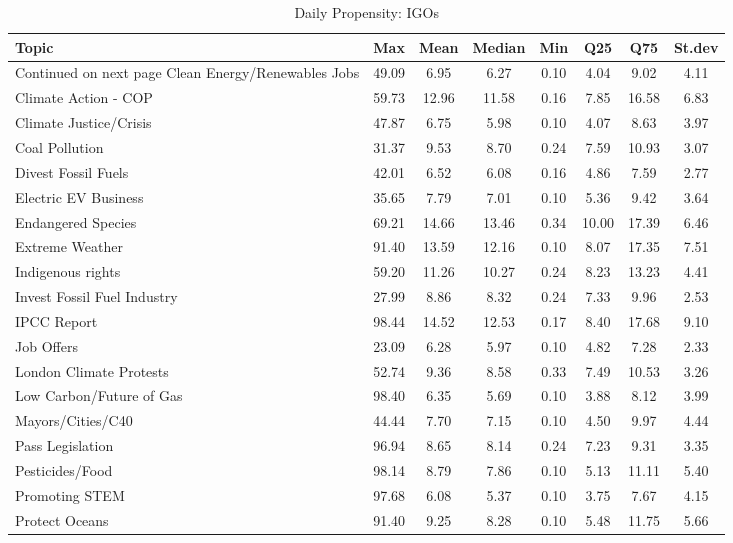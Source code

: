 \begin{longtable}{L|ccccccc}
\caption{Daily Propensity: IGOs} \\ 
  \hline
Topic & Max & Mean & Median & Min & Q25 & Q75 & St.dev \\ 
  \hline 
\endhead 
\hline 
{\footnotesize Continued on next page} 
\endfoot 
\endlastfoot 
Clean Energy/Renewables Jobs & 49.09 & 6.95 & 6.27 & 0.10 & 4.04 & 9.02 & 4.11 \\ 
  Climate Action - COP & 59.73 & 12.96 & 11.58 & 0.16 & 7.85 & 16.58 & 6.83 \\ 
  Climate Justice/Crisis & 47.87 & 6.75 & 5.98 & 0.10 & 4.07 & 8.63 & 3.97 \\ 
  Coal Pollution & 31.37 & 9.53 & 8.70 & 0.24 & 7.59 & 10.93 & 3.07 \\ 
  Divest Fossil Fuels & 42.01 & 6.52 & 6.08 & 0.16 & 4.86 & 7.59 & 2.77 \\ 
  Electric EV Business & 35.65 & 7.79 & 7.01 & 0.10 & 5.36 & 9.42 & 3.64 \\ 
  Endangered Species & 69.21 & 14.66 & 13.46 & 0.34 & 10.00 & 17.39 & 6.46 \\ 
  Extreme Weather & 91.40 & 13.59 & 12.16 & 0.10 & 8.07 & 17.35 & 7.51 \\ 
  Indigenous rights & 59.20 & 11.26 & 10.27 & 0.24 & 8.23 & 13.23 & 4.41 \\ 
  Invest Fossil Fuel Industry & 27.99 & 8.86 & 8.32 & 0.24 & 7.33 & 9.96 & 2.53 \\ 
  IPCC Report & 98.44 & 14.52 & 12.53 & 0.17 & 8.40 & 17.68 & 9.10 \\ 
  Job Offers & 23.09 & 6.28 & 5.97 & 0.10 & 4.82 & 7.28 & 2.33 \\ 
  London Climate Protests & 52.74 & 9.36 & 8.58 & 0.33 & 7.49 & 10.53 & 3.26 \\ 
  Low Carbon/Future of Gas & 98.40 & 6.35 & 5.69 & 0.10 & 3.88 & 8.12 & 3.99 \\ 
  Mayors/Cities/C40 & 44.44 & 7.70 & 7.15 & 0.10 & 4.50 & 9.97 & 4.44 \\ 
  Pass Legislation & 96.94 & 8.65 & 8.14 & 0.24 & 7.23 & 9.31 & 3.35 \\ 
  Pesticides/Food & 98.14 & 8.79 & 7.86 & 0.10 & 5.13 & 11.11 & 5.40 \\ 
  Promoting STEM & 97.68 & 6.08 & 5.37 & 0.10 & 3.75 & 7.67 & 4.15 \\ 
  Protect Oceans & 91.40 & 9.25 & 8.28 & 0.10 & 5.48 & 11.75 & 5.66 \\ 

\end{longtable}
